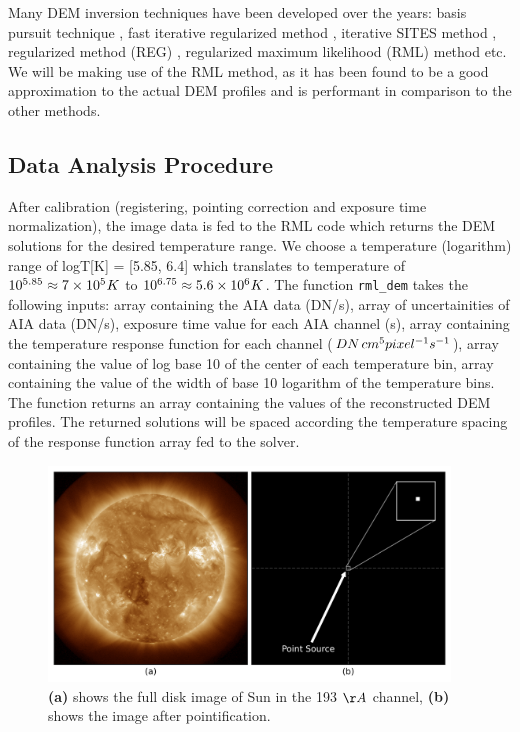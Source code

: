 \message{ !name(main.tex)}\documentclass[12pt]{article}
\begin{document}
Many DEM inversion techniques have been developed over the years: basis pursuit technique \citep{Cheung2015}, fast iterative regularized method \citep{Plowman2013}, iterative SITES method \citep{Morgan2019}, regularized method (REG) \citep{Hannah2012}, regularized maximum likelihood (RML) method \citep{Massa2023} etc. We will be making use of the RML method, as it has been found to be a good approximation to the actual DEM profiles and is performant in comparison to the other methods.

\subsection{Data Analysis Procedure}
\label{sec:data_analysis_procedure}

After calibration (registering, pointing correction and exposure time normalization), the image data is fed to the RML code {\citep{Massa2023}} which returns the DEM solutions for the desired temperature range. We choose a temperature (logarithm) range of logT[K] = [5.85, 6.4] which translates to temperature of $10^{5.85} \approx 7 \times 10^5 \hspace{0.1mm} K$ to $10^{6.75} \approx 5.6 \times 10^6 \hspace{0.1mm} K$. The function \texttt{rml\_dem} takes the following inputs: array containing the AIA data (DN/s), array of uncertainities of AIA data (DN/s), exposure time value for each AIA channel (s), array containing the temperature response function for each channel ($ DN \hspace{0.5mm} cm^5 pixel^{-1} s^{-1}$), array containing the value of log base 10 of the center of each temperature bin, array containing the value of the width of base 10 logarithm of the temperature bins. The function returns an array containing the values of the reconstructed DEM profiles. The returned solutions will be spaced according the temperature spacing of the response function array fed to the solver.\\

\begin{figure}[h!]
    \centering
    \includegraphics[width=0.95\textwidth]{images/ps_plus_full_disk.png}
    \caption[Full Disk and Pointified Image of Sun]{\textbf{(a)} shows the full disk image of Sun in the 193 $\AA$ channel, \textbf{(b)} shows the image after pointification.}
    \label{fig:ps_plus_full_disk}
\end{figure}
\end{document}
